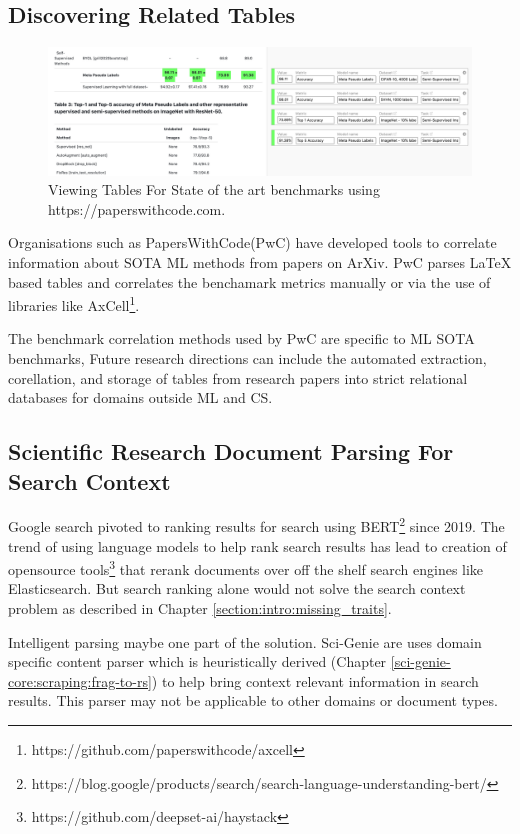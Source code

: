 \subsection{Discovering Related Tables}
\begin{figure}[h]
    \centering
    \includegraphics[width=\maxwidth{\textwidth}]{src/images/pwc-table-exp.pdf}
    \caption{ Viewing Tables For State of the art benchmarks using https://paperswithcode.com. }
    \label{figure\arabic{figurecounter}}
\end{figure}
Organisations such as PapersWithCode(PwC) have developed tools to correlate information about SOTA ML methods from papers on ArXiv. PwC parses LaTeX based tables and correlates the benchamark metrics manually or via the use of libraries like AxCell\footnote{https://github.com/paperswithcode/axcell}. 

The benchmark correlation methods used by PwC are specific to ML SOTA benchmarks, Future research directions can include the automated extraction, corellation, and storage of tables from research papers into strict relational databases for domains outside ML and CS. 

\subsection{Scientific Research Document Parsing For Search Context}
Google search pivoted to ranking results for search using BERT\footnote{https://blog.google/products/search/search-language-understanding-bert/} since 2019. The trend of using language models to help rank search results has lead to creation of opensource tools\footnote{https://github.com/deepset-ai/haystack} that rerank documents over off the shelf search engines like Elasticsearch. But search ranking alone would not solve the search context problem as described in Chapter \ref{section:intro:missing_traits}.

Intelligent parsing maybe one part of the solution. Sci-Genie are uses domain specific content parser which is heuristically derived (Chapter \ref{sci-genie-core:scraping:frag-to-rs}) to help bring context relevant information in search results. This parser may not be applicable to other domains or document types.

